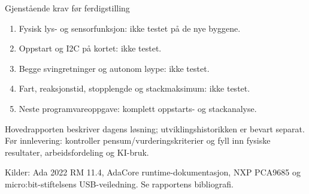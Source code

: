 \documentclass[aspectratio=169,11pt]{beamer}
\begin{document}
\begin{frame}{Gjenstående krav før ferdigstilling}
\begin{enumerate}
\item Fysisk lys- og sensorfunksjon: ikke testet på de nye byggene.
\item Oppstart og I2C på kortet: ikke testet.
\item Begge svingretninger og autonom løype: ikke testet.
\item Fart, reaksjonstid, stopplengde og stackmaksimum: ikke testet.
\item Neste programvareoppgave: komplett oppstarts- og stackanalyse.
\end{enumerate}
\vspace{5mm}
Hovedrapporten beskriver dagens løsning; utviklingshistorikken er bevart
separat. Før innlevering: kontroller pensum/vurderingskriterier og fyll inn
fysiske resultater, arbeidsfordeling og KI-bruk.\par
\vspace{4mm}
\tiny Kilder: Ada 2022 RM 11.4, AdaCore runtime-dokumentasjon, NXP PCA9685
og micro:bit-stiftelsens USB-veiledning. Se rapportens bibliografi.
\end{frame}
\end{document}
